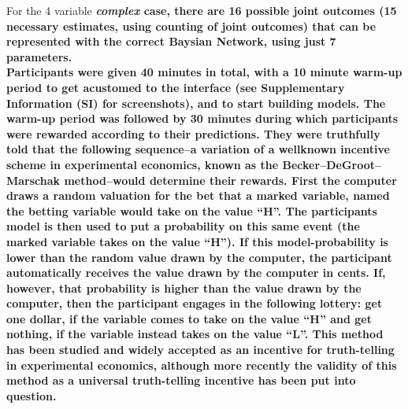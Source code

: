 For the 4 variable {\bf {\it complex} case, there are 16 possible joint outcomes (15 necessary estimates, using counting of joint outcomes) that can be represented with the correct Baysian Network, using just 7 parameters.\\

Participants were given 40 minutes in total, with a 10 minute warm-up period to get acustomed to the interface (see {\bf Supplementary Information (SI) for screenshots}), and to start building models. The warm-up period was followed by 30 minutes during which participants were rewarded according to their predictions. They were truthfully told that the following sequence--a variation of a wellknown incentive scheme in experimental economics, known as the Becker–DeGroot–Marschak method\citep{becker1964measuring}--would determine their rewards.  First the computer draws a random valuation for the bet that a marked variable, named the betting variable would take on the value ``H''.  The participants model is then used to put a probability on this same event (the marked variable takes on the value ``H'').  If this model-probability is lower than the random value drawn by the computer, the participant automatically receives the value drawn by the computer in cents.  If, however, that probability is higher than the value drawn by the computer, then the participant engages in the following lottery: get one dollar, if the variable comes to take on the value ``H'' and get nothing, if the variable instead takes on the value ``L''. This method has been studied and widely accepted as an incentive for truth-telling in experimental economics, although more recently the validity of this method as a universal truth-telling incentive has been put into question\citet{horowitz2006becker}. \\

}
